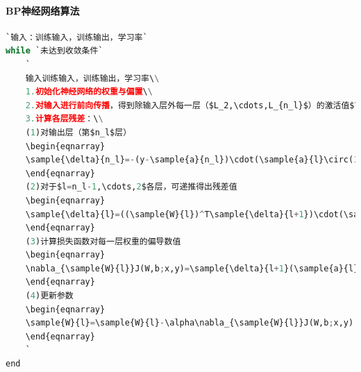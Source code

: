 \paragraph{BP神经网络算法}
\begin{lstlisting}[language=python]
`输入：训练输入，训练输出，学习率`
while `未达到收敛条件`
    `
	输入训练输入，训练输出，学习率\\
	1.初始化神经网络的权重与偏置\\
	2.对输入进行前向传播，得到除输入层外每一层（$L_2,\cdots,L_{n_l}$）的激活值$\sample{a}{2},\cdots,\sample{a}{n_l}$\\
	3.计算各层残差：\\
	(1)对输出层（第$n_l$层）
	\begin{eqnarray}
	\sample{\delta}{n_l}=-(y-\sample{a}{n_l})\cdot(\sample{a}{l}\circ(1-\sample{a}{l}))
	\end{eqnarray}
	(2)对于$l=n_l-1,\cdots,2$各层，可递推得出残差值
	\begin{eqnarray}
	\sample{\delta}{l}=((\sample{W}{l})^T\sample{\delta}{l+1})\cdot(\sample{a}{l})
	\end{eqnarray}
	(3)计算损失函数对每一层权重的偏导数值
	\begin{eqnarray}
	\nabla_{\sample{W}{l}}J(W,b;x,y)=\sample{\delta}{l+1}(\sample{a}{l})^T
	\end{eqnarray}
	(4)更新参数
	\begin{eqnarray}
	\sample{W}{l}=\sample{W}{l}-\alpha\nabla_{\sample{W}{l}}J(W,b;x,y)
	\end{eqnarray}
    `
end

\end{lstlisting}

